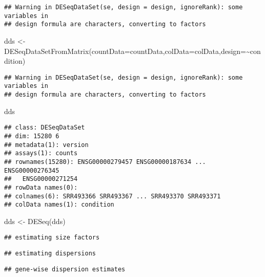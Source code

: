 \documentclass[
]{article}
\newenvironment{Shaded}{\begin{snugshade}}{\end{snugshade}}
\newcommand{\AttributeTok}[1]{\textcolor[rgb]{0.77,0.63,0.00}{#1}}
\newcommand{\FunctionTok}[1]{\textcolor[rgb]{0.00,0.00,0.00}{#1}}
\newcommand{\NormalTok}[1]{#1}
\newcommand{\OtherTok}[1]{\textcolor[rgb]{0.56,0.35,0.01}{#1}}
\newcommand{\SpecialCharTok}[1]{\textcolor[rgb]{0.00,0.00,0.00}{#1}}
\begin{document}
\begin{verbatim}
## Warning in DESeqDataSet(se, design = design, ignoreRank): some variables in
## design formula are characters, converting to factors
\end{verbatim}

\begin{Shaded}
\begin{Highlighting}[]
\NormalTok{dds }\OtherTok{\textless{}{-}} \FunctionTok{DESeqDataSetFromMatrix}\NormalTok{(}\AttributeTok{countData=}\NormalTok{countData,}\AttributeTok{colData=}\NormalTok{colData,}\AttributeTok{design=}\SpecialCharTok{\textasciitilde{}}\NormalTok{condition)}
\end{Highlighting}
\end{Shaded}

\begin{verbatim}
## Warning in DESeqDataSet(se, design = design, ignoreRank): some variables in
## design formula are characters, converting to factors
\end{verbatim}

\begin{Shaded}
\begin{Highlighting}[]
\NormalTok{dds}
\end{Highlighting}
\end{Shaded}

\begin{verbatim}
## class: DESeqDataSet 
## dim: 15280 6 
## metadata(1): version
## assays(1): counts
## rownames(15280): ENSG00000279457 ENSG00000187634 ... ENSG00000276345
##   ENSG00000271254
## rowData names(0):
## colnames(6): SRR493366 SRR493367 ... SRR493370 SRR493371
## colData names(1): condition
\end{verbatim}

\begin{Shaded}
\begin{Highlighting}[]
\NormalTok{dds }\OtherTok{\textless{}{-}} \FunctionTok{DESeq}\NormalTok{(dds)}
\end{Highlighting}
\end{Shaded}

\begin{verbatim}
## estimating size factors
\end{verbatim}

\begin{verbatim}
## estimating dispersions
\end{verbatim}

\begin{verbatim}
## gene-wise dispersion estimates
\end{verbatim}
\end{document}
